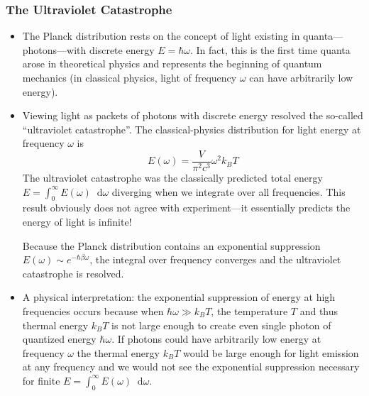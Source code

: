 \documentclass[11pt, a4paper]{article}
\newcommand{\diff}{\mathop{}\!\mathrm{d}} %
\begin{document}
\subsubsection{The Ultraviolet Catastrophe}
\begin{itemize}
	\item The Planck distribution rests on the concept of light existing in quanta---photons---with discrete energy $ E = \hbar \omega $. In fact, this is the first time quanta arose in theoretical physics and represents the beginning of quantum mechanics (in classical physics, light of frequency $ \omega $ can have arbitrarily low energy).
	
	\item Viewing light as packets of photons with discrete energy resolved the so-called ``ultraviolet catastrophe''. The classical-physics distribution for light energy at frequency $ \omega $ is 
	\begin{equation*}
		E(\omega) = \frac{V}{\pi^{2}c^{3}}\omega^{2}k_{B}T
	\end{equation*}
	The ultraviolet catastrophe was the classically predicted total energy $ E = \int_{0}^{\infty} E(\omega)\diff \omega $ diverging when we integrate over all frequencies. This result obviously does not agree with experiment---it essentially predicts the energy of light is infinite! 
	
	Because the Planck distribution contains an exponential suppression $ E(\omega) \sim e^{-\hbar \beta \omega} $, the integral over frequency converges and the ultraviolet catastrophe is resolved. 
	
	\item A physical interpretation: the exponential suppression of energy at high frequencies occurs because when $ \hbar \omega \gg k_{B}T $, the temperature $ T $ and thus thermal energy $ k_{B}T $ is not large enough to create even single photon of quantized energy $ \hbar \omega $. If photons could have arbitrarily low energy at frequency $ \omega $ the thermal energy $ k_{B}T $ would be large enough for light emission at any frequency and we would not see the exponential suppression necessary for finite $ E = \int_{0}^{\infty}E(\omega)\diff \omega$.
	

\end{itemize}
\end{document}
